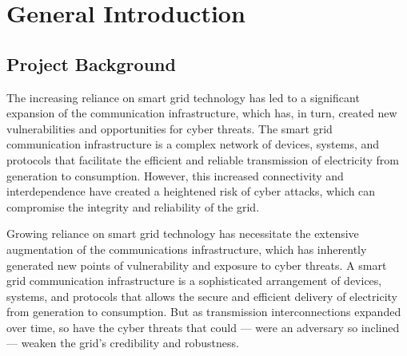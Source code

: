 \chapter*{General Introduction} 
\label{chap:introduction} 
%
%
%
%
%
%
%


\section*{Project Background}
The increasing reliance on smart grid technology has led to a significant expansion of the communication infrastructure, which has, in turn, created new vulnerabilities and opportunities for cyber threats. The smart grid communication infrastructure is a complex network of devices, systems, and protocols that facilitate the efficient and reliable transmission of electricity from generation to consumption. However, this increased connectivity and interdependence have created a heightened risk of cyber attacks, which can compromise the integrity and reliability of the grid.

Growing reliance on smart grid technology has necessitate the extensive augmentation of the communications infrastructure, which has inherently generated new points of vulnerability and exposure to cyber threats. A smart grid communication infrastructure is a sophisticated arrangement of devices, systems, and protocols that allows the secure and efficient delivery of electricity from generation to consumption. But as transmission interconnections expanded over time, so have the cyber threats that could — were an adversary so inclined — weaken the grid's credibility and robustness.



